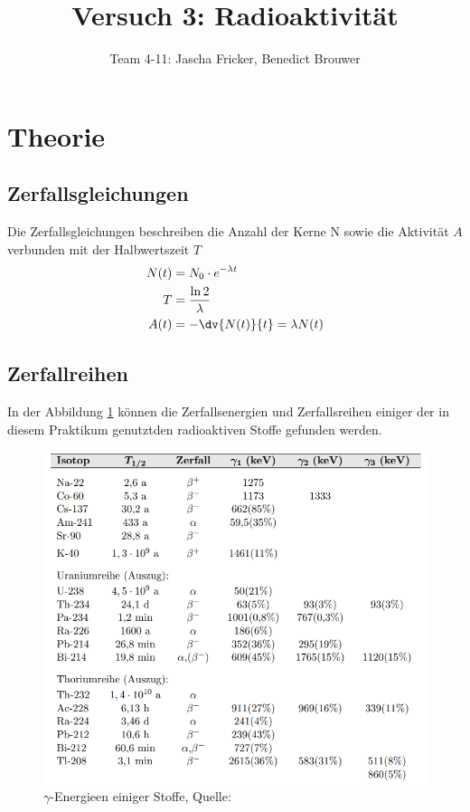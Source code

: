 \documentclass[11pt, a4paper]{article}
\title{Versuch 3: Radioaktivität}
\author{Team 4-11: Jascha Fricker, Benedict Brouwer}
\begin{document}
    \maketitle

    \tableofcontents

    \newpage

    \section{Theorie}
    \subsection{Zerfallsgleichungen}
    Die Zerfallsgleichungen beschreiben die Anzahl der Kerne N sowie die Aktivität $A$ verbunden mit der Halbwertszeit $T$
    \begin{align}
        N(t) &= N_0 \cdot e^{- \lambda t} \\
        T &= \frac{\ln 2}{\lambda} \label{eq:Halbwertszeit}  \\ 
        A(t) &= - \dv{N(t)}{t} = \lambda N(t) \label{Aktivität-halb}
    \end{align}
    
    \subsection{Zerfallreihen}
    In der Abbildung \ref{fig:zerf} können die Zerfallsenergien und Zerfallsreihen einiger der in diesem Praktikum genutztden radioaktiven Stoffe gefunden werden.

    \begin{figure}[!h]
        \centering
        \includegraphics[width=\textwidth]{Screenshot 2023-03-14 5.37.47 PM.png}

        \caption{$\gamma$-Energieen einiger Stoffe, Quelle: \cite{RAD}}
        \label{fig:zerf}
    \end{figure}
    
\end{document}
